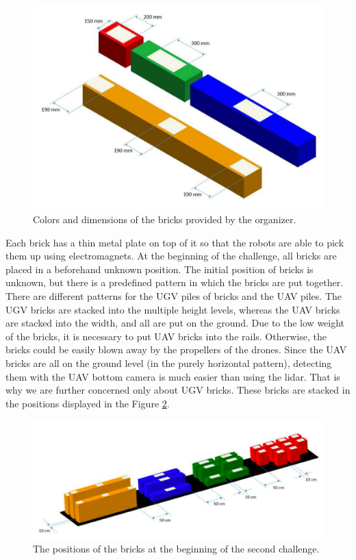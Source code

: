 \begin{figure}[H]

\centering
\includegraphics[scale=0.35]{fig/brick_sample.png}
\caption[Bricks definition]{Colors and dimensions of the bricks provided by the organizer.}
\label{fig:brickdef}

\end{figure}

Each brick has a thin metal plate on top of it so that the robots are able to pick them up using electromagnets. At the beginning of the challenge, all bricks are placed in a beforehand unknown position. The initial position of bricks is unknown, but there is a predefined pattern in which the bricks are put together. There are different patterns for the UGV piles of bricks and the UAV piles. The UGV bricks are stacked into the multiple height levels, whereas the UAV bricks are stacked into the width, and all are put on the ground. Due to the low weight of the bricks, it is necessary to put UAV bricks into the rails. Otherwise, the bricks could be easily blown away by the propellers of the drones. Since the UAV bricks are all on the ground level (in the purely horizontal pattern), detecting them with the UAV bottom camera is much easier than using the lidar. That is why we are further concerned only about UGV bricks. These bricks are stacked in the positions displayed in the Figure \ref{fig:piledef}.

\begin{figure}[H]

\centering
\includegraphics[scale=0.35]{fig/initial_layout.png}
\caption[Initial brick layout]{The positions of the bricks at the beginning of the second challenge.}
\label{fig:piledef}

\end{figure}

